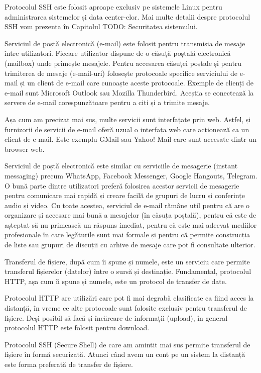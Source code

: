 Protocolul SSH este folosit aproape exclusiv pe sistemele Linux pentru administrarea sistemelor și data center-elor. Mai multe detalii despre protocolul SSH vom prezenta în Capitolul TODO: Securitatea sistemului.

Serviciul de poștă electronică (e-mail) este folosit pentru transmisia de mesaje între utilizatori. Fiecare utilizator dispune de o căsuță poștală electronică (mailbox) unde primește mesajele. Pentru accesarea căsuței poștale și pentru trimiterea de mesaje (e-mail-uri) folosește protocoale specifice serviciului de e-mail și un client de e-mail care cunoaște aceste protocoale. Exemple de clienți de e-mail sunt Microsoft Outlook sau Mozilla Thunderbird. Aceștia se conectează la servere de e-mail corespunzătoare pentru a citi și a trimite mesaje.

Așa cum am precizat mai sus, multe servicii sunt interfațate prin web. Astfel, și furnizorii de servicii de e-mail oferă uzual o interfața web care acționează ca un client de e-mail. Este exemplu GMail sau Yahoo! Mail care sunt accesate dintr-un browser web.

Serviciul de poștă electronică este similar cu serviciile de mesagerie (instant messaging) precum WhatsApp, Facebook Messenger, Google Hangouts, Telegram. O bună parte dintre utilizatori preferă folosirea acestor servicii de mesagerie pentru comunicare mai rapidă și creare facilă de grupuri de lucru și conferințe audio și video. Cu toate acestea, serviciul de e-mail rămâne util pentru că are o organizare și accesare mai bună a mesajelor (în căsuța poștală), pentru că este de așteptat să nu primească un răspuns imediat, pentru că este mai adecvat mediilor profesionale în care legăturile sunt mai formale și pentru că permite construcția de liste sau grupuri de discuții cu arhive de mesaje care pot fi consultate ulterior.

Transferul de fișiere, după cum îi spune și numele, este un serviciu care permite transferul fișierelor (datelor) între o sursă și destinație. Fundamental, protocolul HTTP, așa cum îi spune și numele, este un protocol de transfer de date.

Protocolul HTTP are utilizări care pot fi mai degrabă clasificate ca fiind acces la distanță, în vreme ce alte protocoale sunt folosite exclusiv pentru transferul de fișiere. Deși posibil să facă și încărcare de informații (upload), în general protocolul HTTP este folosit pentru download.

Protocolul SSH (Secure Shell) de care am amintit mai sus permite transferul de fișiere în formă securizată. Atunci când avem un cont pe un sistem la distanță este forma preferată de transfer de fișiere.

